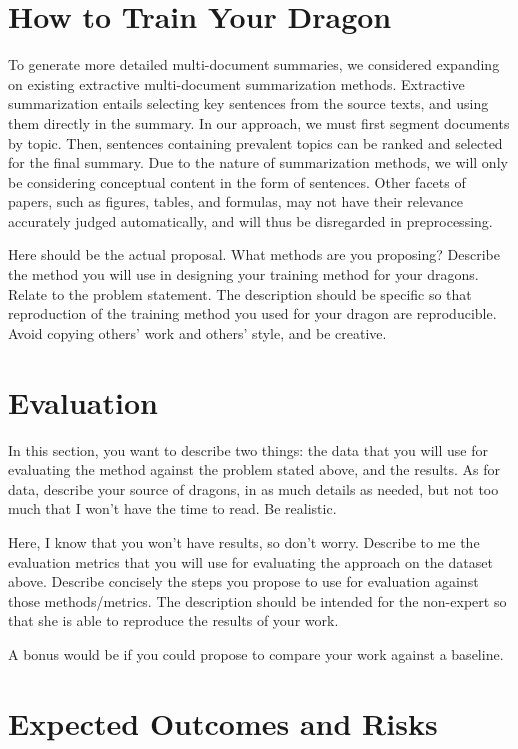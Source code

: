 \documentclass[conference]{sig-alternate-05-2015}
\begin{document}
\section{How to Train Your Dragon}\label{sec:design}

To generate more detailed multi-document summaries, we considered expanding on existing extractive multi-document summarization 
methods. Extractive summarization entails selecting key sentences from the source texts, and using them directly in the 
summary. In our approach, we must first segment documents by topic. Then, sentences containing prevalent topics can be 
ranked and selected for the final summary. Due to the nature of summarization methods, we will only be considering 
conceptual content in the form of sentences. Other facets of papers, such as figures, tables, and formulas, may not have 
their relevance accurately judged automatically, and will thus be disregarded in preprocessing.

Here should be the actual proposal. What methods are you proposing? Describe the method you will use in designing your training method for your dragons. Relate to the problem statement. The description should be specific so that reproduction of the training method you used for your dragon are reproducible. Avoid copying others' work and others' style, and be creative. 

\section{Evaluation}\label{sec:evaluation}

In this section, you want to describe two things: the data that you will use for evaluating the method against the problem stated above, and the results. As for data, describe your source of dragons, in as much details as needed, but not too much that I won't have the time to read. Be realistic. 

Here, I know that you won't have results, so don't worry. Describe to me the evaluation metrics that you will use for evaluating the approach on the dataset above. Describe concisely the steps you propose to use for evaluation against those methods/metrics. The description should be intended for the non-expert so that she is able to reproduce the results of your work. 

A bonus would be if you could propose to compare your work against a baseline. 

\section{Expected Outcomes and Risks}
\end{document}
